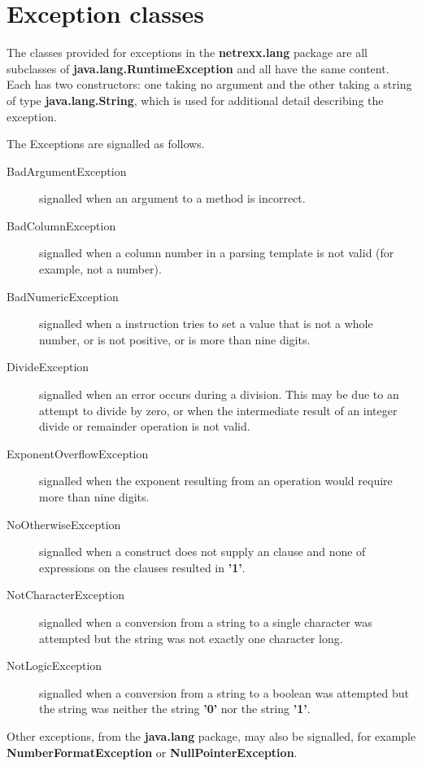 \chapter{Exception classes}\label{refnlexcep}
 
The classes provided for exceptions in the \textbf{netrexx.lang} package
are all subclasses of \textbf{java.lang.RuntimeException} and all have
the same content.  Each has two constructors: one taking no argument and
the other taking a string of type \textbf{java.lang.String}, which is
used for additional detail describing the exception.
 
The Exceptions are signalled as follows.
\begin{description}
\item[BadArgumentException]\label{refexpbae}
 signalled when an argument to a method is incorrect.
\item[BadColumnException]\label{refexpbce}
 signalled when a column number in a parsing template is not valid
(for example, not a number).
\item[BadNumericException]\label{refexpbne}
 signalled when a  instruction tries to set
a value that is not a whole number, or is not positive, or is more than
nine digits.
\item[DivideException]\label{refexpdve}
 signalled when an error occurs during a division.  This may be due
to an attempt to divide by zero, or when the intermediate result of an
integer divide or remainder operation is not valid.
\item[ExponentOverflowException]\label{refexpeoe}
 signalled when the exponent resulting from an operation would
require more than nine digits.
\item[NoOtherwiseException]\label{refexpnoe}
 signalled when a  construct does not supply an
 clause and none of expressions on the 
clauses resulted in \textbf{'1'}.
\item[NotCharacterException]\label{refexpnce}
 signalled when a conversion from a string to a single character was
attempted but the string was not exactly one character long.
\item[NotLogicException]\label{refexpnle}
 signalled when a conversion from a string to a boolean was
attempted but the string was neither the string \textbf{'0'} nor the
string \textbf{'1'}.
\end{description}
 
Other exceptions, from the \textbf{java.lang} package, may also be
signalled, for example \textbf{NumberFormatException}
or \textbf{NullPointerException}.

